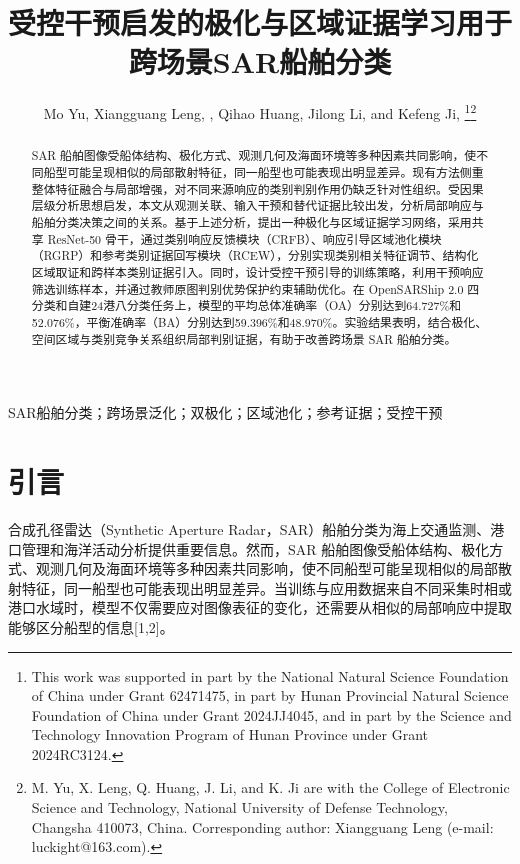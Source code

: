 \documentclass[journal,10pt,a4paper]{IEEEtran}
\begin{document}
\title{受控干预启发的极化与区域证据学习用于跨场景SAR船舶分类}\author{Mo Yu, Xiangguang Leng, , Qihao Huang, Jilong Li, and Kefeng Ji, \thanks{This work was supported in part by the National Natural Science Foundation of China under Grant 62471475, in part by Hunan Provincial Natural Science Foundation of China under Grant 2024JJ4045, and in part by the Science and Technology Innovation Program of Hunan Province under Grant 2024RC3124.}\thanks{M. Yu, X. Leng, Q. Huang, J. Li, and K. Ji are with the College of Electronic Science and Technology, National University of Defense Technology, Changsha 410073, China. Corresponding author: Xiangguang Leng (e-mail: luckight@163.com).}}\maketitle

\renewcommand{\abstractname}{摘要}\begin{abstract}SAR 船舶图像受船体结构、极化方式、观测几何及海面环境等多种因素共同影响，使不同船型可能呈现相似的局部散射特征，同一船型也可能表现出明显差异。现有方法侧重整体特征融合与局部增强，对不同来源响应的类别判别作用仍缺乏针对性组织。受因果层级分析思想启发，本文从观测关联、输入干预和替代证据比较出发，分析局部响应与船舶分类决策之间的关系。基于上述分析，提出一种极化与区域证据学习网络，采用共享 ResNet-50 骨干，通过类别响应反馈模块（CRFB）、响应引导区域池化模块（RGRP）和参考类别证据回写模块（RCEW），分别实现类别相关特征调节、结构化区域取证和跨样本类别证据引入。同时，设计受控干预引导的训练策略，利用干预响应筛选训练样本，并通过教师原图判别优势保护约束辅助优化。在 OpenSARShip 2.0 四分类和自建24港八分类任务上，模型的平均总体准确率（OA）分别达到64.727\%和52.076\%，平衡准确率（BA）分别达到59.396\%和48.970\%。实验结果表明，结合极化、空间区域与类别竞争关系组织局部判别证据，有助于改善跨场景 SAR 船舶分类。\end{abstract}

\begin{IEEEkeywords}SAR船舶分类；跨场景泛化；双极化；区域池化；参考证据；受控干预\end{IEEEkeywords}

\section{引言}\label{ux5f15ux8a00}

合成孔径雷达（Synthetic Aperture Radar，SAR）船舶分类为海上交通监测、港口管理和海洋活动分析提供重要信息。然而，SAR 船舶图像受船体结构、极化方式、观测几何及海面环境等多种因素共同影响，使不同船型可能呈现相似的局部散射特征，同一船型也可能表现出明显差异。当训练与应用数据来自不同采集时相或港口水域时，模型不仅需要应对图像表征的变化，还需要从相似的局部响应中提取能够区分船型的信息{[}1,2{]}。
\end{document}
